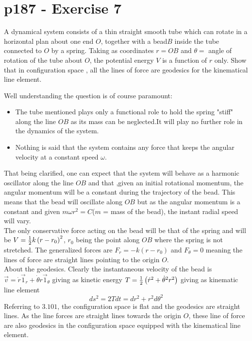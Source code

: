 \section{p187 - Exercise 7}
\begin{tcolorbox}
A dynamical system consists of a thin straight smooth tube which can rotate in a horizontal plan about one end $O$, together with a bead$B$ inside the tube connected to $O$ by a spring. Taking as coordinates $r=OB$ and $\theta = $ angle of rotation of the tube about $O$, the potential energy $V$ is a function of $r$ only. Show that in configuration space , all the lines of force are geodesics for the kinematical line element.
\end{tcolorbox}
Well understanding the question is of course paramount:
\begin{itemize}
  \item  The tube mentioned plays only a functional role to hold the spring "stiff" along the line $OB$ as its mass can be neglected.It  will play  no further role in the dynamics of the system. 
  \item Nothing is said that the system contains any force that keeps the angular velocity at a constant speed $\omega$. 
\end{itemize}  
That being clarified, one can expect that the system will behave as a harmonic oscillator along the line  $OB$ and that ,given an initial rotational momentum, the angular momentum will be a constant during the trajectory of the bead.
This means that the bead will oscillate along $OB$ but as the angular momentum is a constant and  given $m \omega r^2 =C$($m$ = mass of the bead), the  instant radial speed will vary.\\
The only conservative force acting on the bead will be that of the spring and will be $V=\frac{1}{2} k \left( r-r_0 \right)^2$, $r_0$ being the point along $OB$ where the spring is not stretched. The generalized forces are $F_r = - k\left( r-r_0 \right)$ and $F_{\theta}= 0$ meaning the lines of force are straight lines pointing to the origin $O$.\\
About the geodesics. Clearly the instantaneous velocity of the bead is $\overrightarrow{v} = \dot{r}\overrightarrow{1}_r+ \dot{\theta}r\overrightarrow{1}_{\theta}$ giving as kinetic energy $T=\frac{1}{2}\left(\dot{r}^2+\dot{\theta}^2 r^2\right)$ giving as kinematic line element
$$ds^2= 2Tdt = dr^2+r^2d\theta^2$$
Referring to $\mathbf{3.101}$, the configuration space is flat and the geodesics are straight lines. As the line forces are straight lines towards the origin $O$, these line of force are also geodesics in the configuration space equipped with the kinematical line element.

